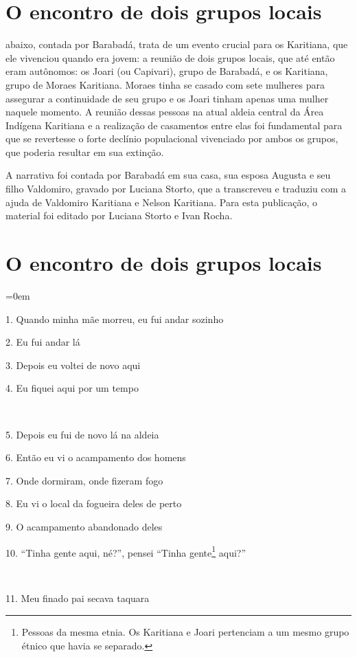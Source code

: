 \chapter{O encontro de dois grupos locais}

 abaixo, contada por Barabadá, trata de um evento crucial para
os Karitiana, que ele vivenciou quando era jovem: a reunião de dois
grupos locais, que até então eram autônomos: os Joari (ou Capivari),
grupo de Barabadá, e os Karitiana, grupo de Moraes Karitiana. Moraes
tinha se casado com sete mulheres para assegurar a continuidade de seu
grupo e os Joari tinham apenas uma mulher naquele momento. A reunião
dessas pessoas na atual aldeia central da Área Indígena Karitiana e a
realização de casamentos entre elas foi fundamental para que se
revertesse o forte declínio populacional vivenciado por ambos os grupos,
que poderia resultar em sua extinção.

A narrativa foi contada por Barabadá em sua casa, sua esposa Augusta e
seu filho Valdomiro, gravado por Luciana Storto, que a transcreveu e
traduziu com a ajuda de Valdomiro Karitiana e Nelson Karitiana. Para
esta publicação, o material foi editado por Luciana Storto e Ivan Rocha.

\chapter*{O encontro de dois grupos locais}

\begingroup\parindent=0em

1. Quando minha mãe morreu, eu fui andar sozinho

2. Eu fui andar lá

3. Depois eu voltei de novo aqui

4. Eu fiquei aqui por um tempo

~

5. Depois eu fui de novo lá na aldeia

6. Então eu vi o acampamento dos homens

7. Onde dormiram, onde fizeram fogo

8. Eu vi o local da fogueira deles de perto

9. O acampamento abandonado deles

10. ``Tinha gente aqui, né?'', pensei ``Tinha gente\footnote{Pessoas da
  mesma etnia.  Os Karitiana e Joari pertenciam a um mesmo grupo étnico
  que havia se separado.} aqui?''

~

11. Meu finado pai secava taquara


